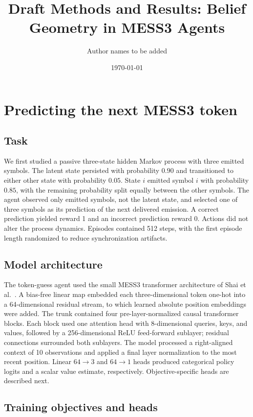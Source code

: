 \documentclass[11pt]{article}
\title{Draft Methods and Results: Belief Geometry in MESS3 Agents}
\author{Author names to be added}
\date{\today}
\begin{document}
\maketitle

\section{Predicting the next MESS3 token}
\label{sec:token-guess}

\subsection{Task}

We first studied a passive three-state hidden Markov process with three emitted
symbols. The latent state persisted with probability \(0.90\) and transitioned
to either other state with probability \(0.05\). State \(i\) emitted symbol
\(i\) with probability \(0.85\), with the remaining probability split equally
between the other symbols. The agent observed only emitted symbols, not the
latent state, and selected one of three symbols as its prediction of the next
delivered emission. A correct prediction yielded reward 1 and an incorrect
prediction reward 0. Actions did not alter the process dynamics. Episodes
contained 512 steps, with the first episode length randomized to reduce
synchronization artifacts.

\subsection{Model architecture}

The token-guess agent used the small MESS3 transformer architecture of
Shai et al.~\cite{shai2024transformers}. A bias-free linear map embedded each
three-dimensional token one-hot into a 64-dimensional residual stream, to
which learned absolute position embeddings were added. The trunk contained
four pre-layer-normalized causal transformer blocks. Each block used one
attention head with 8-dimensional queries, keys, and values, followed by a
256-dimensional ReLU feed-forward sublayer; residual connections surrounded
both sublayers. The model processed a right-aligned context of 10 observations
and applied a final layer normalization to the most recent position. Linear
\(64\!\rightarrow\!3\) and \(64\!\rightarrow\!1\) heads produced categorical
policy logits and a scalar value estimate, respectively. Objective-specific
heads are described next.

\subsection{Training objectives and heads}
\end{document}
